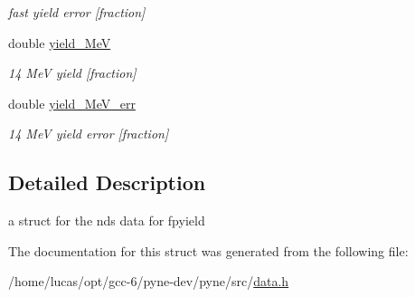\begin{DoxyCompactItemize}
\begin{DoxyCompactList}\small\item\em fast yield error \mbox{[}fraction\mbox{]} \end{DoxyCompactList}\item 
double \hyperlink{structpyne_1_1ndsfpysub_afb3737be03fedddc6f54fa3a0e59f0e8}{yield\+\_\+MeV}\hypertarget{structpyne_1_1ndsfpysub_afb3737be03fedddc6f54fa3a0e59f0e8}{}\label{structpyne_1_1ndsfpysub_afb3737be03fedddc6f54fa3a0e59f0e8}

\begin{DoxyCompactList}\small\item\em 14 MeV yield \mbox{[}fraction\mbox{]} \end{DoxyCompactList}\item 
double \hyperlink{structpyne_1_1ndsfpysub_a7bc2487245689a3f6a095f2254e66e99}{yield\+\_\+Me\+V\+\_\+err}\hypertarget{structpyne_1_1ndsfpysub_a7bc2487245689a3f6a095f2254e66e99}{}\label{structpyne_1_1ndsfpysub_a7bc2487245689a3f6a095f2254e66e99}

\begin{DoxyCompactList}\small\item\em 14 MeV yield error \mbox{[}fraction\mbox{]} \end{DoxyCompactList}\end{DoxyCompactItemize}


\subsection{Detailed Description}
a struct for the nds data for fpyield 

The documentation for this struct was generated from the following file\+:\begin{DoxyCompactItemize}
\item 
/home/lucas/opt/gcc-\/6/pyne-\/dev/pyne/src/\hyperlink{data_8h}{data.\+h}\end{DoxyCompactItemize}
